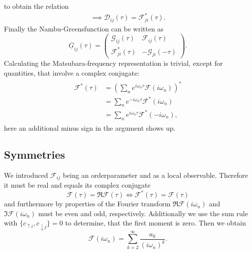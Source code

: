 \documentclass[aps,prb,twocolumn,groupedaddress,amsmath,amssymb]{revtex4-1}
\newcommand{\up}{\uparrow}
\newcommand{\dn}{\downarrow}
\newcommand{\nambu}[1]{\mathcal{#1}}
\newcommand{\Nambu}[1]{\underline{#1}}
\begin{document}
to obtain the relation
\begin{align}
  \label{eq:D2}
    \implies\nambu{D}_{ij}(\tau)=\nambu{F}^\ast_{ji}(\tau).
\end{align}
Finally the Nambu-Greensfunction can be written as
\begin{equation}
  \label{eq:nambugftau}
    \Nambu{G}_{ij}(\tau)=\begin{pmatrix}\nambu{G}_{ij}(\tau)&\nambu{F}_{ij}(\tau)\\\nambu{F}^\ast_{ji}(\tau)&-\nambu{G}_{ji}(-\tau)\end{pmatrix}.
 \end{equation}
Calculating the Matsubara-frequency representation is trivial, except for quantities, that involve a complex conjugate:
\begin{align}
  \label{eq:fiwn}
  \begin{split}
    \nambu{F}^\ast(\tau)&=\left(\sum_ne^{i\omega_n\tau}\nambu{F}(i\omega_n)\right)^\ast\\
    &=\sum_ne^{-i\omega_n\tau}\nambu{F}^\ast(i\omega_n)\\
    &=\sum_ne^{i\omega_n\tau}\nambu{F}^\ast(-i\omega_n),
  \end{split}
\end{align}
here an additional minus sign in the argument shows up.

\subsection{Symmetries}
We introduced $\nambu{F}_{ij}$ being an orderparameter and as a local observable. Therefore it must be real and equals its complex conjugate
\begin{equation}
  \label{eq:realsymmetry}
  \nambu{F}(\tau)=\Re\nambu{F}(\tau)\iff\nambu{F}^\ast(\tau)=\nambu{F}(\tau)
\end{equation}
and furthermore by properties of the Fourier transform $\Re\nambu{F}(i\omega_n)$ and $\Im\nambu{F}(i\omega_n)$ must be even and odd, respectively.
Additionally we use the sum rule with $\{c_{\up i}, c_{\dn j}\}=0$ to determine, that the first moment is zero. Then we obtain
\begin{equation}
  \label{eq:moments}
  \nambu{F}(i\omega_n)=\sum^\infty_{k=2} \frac{a_k}{(i\omega_n)^k}.
\end{equation}
\end{document}
